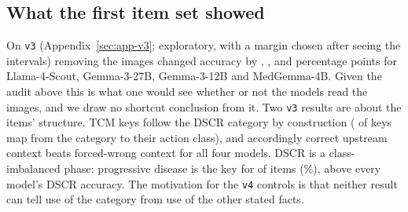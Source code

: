 \documentclass[11pt]{article}
\begin{document}
\begin{table}[t]
\centering
\footnotesize
\setlength{\tabcolsep}{3pt}

\caption{E2: share of answers (\%) that equal the donor's key when the image is swapped, and when there is no image; the gain is the difference in percentage points.}
\label{tab:e2}
\end{table}

\begin{table}[t]
\centering
\footnotesize
\setlength{\tabcolsep}{3pt}

\caption{E3: TCM accuracy under true, random wrong and absent upstream context, and the share of answers that move to the rule's answer after the stated category is changed (label) or the stated timing crosses the 12-week window (timing, progressive-disease items).}
\label{tab:e3}
\end{table}

\begin{table}[t]
\centering
\footnotesize
\setlength{\tabcolsep}{3pt}

\caption{E5: PJRF Brier score with the true upstream context, against the leave-one-out constant base rate; skill $=1-$ Brier / base-rate Brier.}
\label{tab:e5}
\end{table}

\subsection{What the first item set showed}
\label{sec:v3-summary}

On \texttt{v3} (Appendix~\ref{sec:app-v3}; exploratory, with a margin chosen after seeing the intervals) removing the images changed accuracy by \vthreeDiffScout{}, \vthreeDiffGemmaTwentySeven{}, \vthreeDiffGemmaTwelve{} and \vthreeDiffMedGemma{} percentage points for Llama-4-Scout, Gemma-3-27B, Gemma-3-12B and MedGemma-4B. Given the audit above this is what one would see whether or not the models read the images, and we draw no shortcut conclusion from it. Two \texttt{v3} results are about the items' structure. TCM keys follow the DSCR category by construction (\tcmAgree{} of \tcmN{} keys map from the category to their action class), and accordingly correct upstream context beats forced-wrong context for all four models. DSCR is a class-imbalanced phase: progressive disease is the key for \dscrMajorityCount{} of \nPatVthree{} items (\dscrMajorityPct{}\%), above every model's DSCR accuracy. The motivation for the \texttt{v4} controls is that neither result can tell use of the category from use of the other stated facts.
\end{document}

